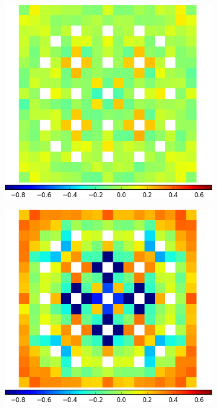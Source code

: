 \begin{figure}[h!]
\begin{subfigure}{0.45\textwidth}
  \caption{}
  \label{fig:chap11-assm-3.1-20BPs-capt-degenerate}
\end{subfigure}
\begin{subfigure}{0.45\textwidth}
  \centering
  \includegraphics[width=\linewidth]{figures/results/assm-31-20BPs/no-transform/capt-err-lns}
  \caption{}
  \label{fig:chap11-assm-3.1-20BPs-capt-lns}
\end{subfigure}%
\begin{subfigure}{0.45\textwidth}
  \centering
  \includegraphics[width=\linewidth]{figures/results/assm-31-20BPs/no-transform/capt-err-pinch-agglomerative-(2)}

\end{subfigure}
\end{figure}
